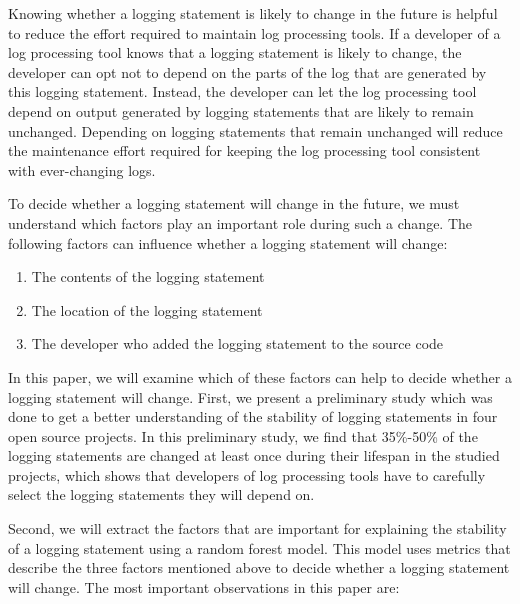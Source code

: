 Knowing whether a logging statement is likely to change in the future is helpful to reduce the effort required to maintain log processing tools. If a developer of a log processing tool knows that a logging statement is likely to change, the developer can opt not to depend on the parts of the log that are generated by this logging statement. Instead, the developer can let the log processing tool depend on output generated by logging statements that are likely to remain unchanged. Depending on logging statements that remain unchanged will reduce the maintenance effort required for keeping the log processing tool consistent with ever-changing logs. 


To decide whether a logging statement will change in the future, we must understand which factors play an important role during such a change. The following factors can influence whether a logging statement will change:
\begin{enumerate}
\item The contents of the logging statement
\item The location of the logging statement
\item The developer who added the logging statement to the source code
\end{enumerate}
In this paper, we will examine which of these factors can help to decide whether a logging statement will change. First, we present a preliminary study which was done to get a better understanding of the stability of logging statements in four open source projects. In this preliminary study, we find that 35\%-50\% of the logging statements are changed at least once during their lifespan in the studied projects, which shows that developers of log processing tools have to carefully select the logging statements they will depend on. 

Second, we will extract the factors that are important for explaining the stability of a logging statement using a random forest model. This model uses metrics that describe the three factors mentioned above to decide whether a logging statement will change.
The most important observations in this paper are:



